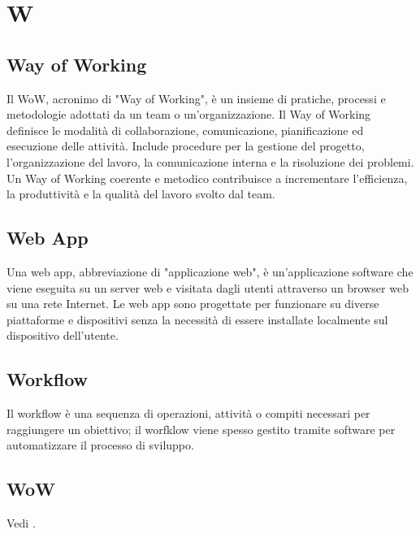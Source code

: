 \section{W}

\vspace{2em}
\subsection*{Way of Working}
\par Il WoW, acronimo di "Way of Working", è un insieme di pratiche, processi e metodologie adottati da un team o un'organizzazione. Il Way of Working definisce le modalità di collaborazione, comunicazione, pianificazione ed esecuzione delle attività. Include procedure per la gestione del progetto, l'organizzazione del lavoro, la comunicazione interna e la risoluzione dei problemi. Un Way of Working coerente e metodico contribuisce a incrementare l'efficienza, la produttività e la qualità del lavoro svolto dal team.

\vspace{2em}
\subsection*{Web App}
\par Una web app, abbreviazione di "applicazione web", è un'applicazione software che viene eseguita su un server web e visitata dagli utenti attraverso un browser web su una rete Internet. Le web app sono progettate per funzionare su diverse piattaforme e dispositivi senza la necessità di essere installate localmente sul dispositivo dell'utente.

\vspace{2em}
\subsection*{Workflow}
\par Il workflow è una sequenza di operazioni, attività o compiti necessari per raggiungere un obiettivo; il worfklow viene spesso gestito tramite software per automatizzare il processo di sviluppo.

\vspace{2em}
\subsection*{WoW}
\par Vedi .
